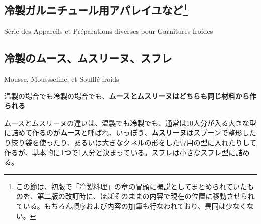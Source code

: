 \begin{main}

\hypertarget{serie-des-appareiles-et-preparations-diverses-pour-garnitures-froides}{%
\section[冷製ガルニチュール用アパレイユなど]{\texorpdfstring{冷製ガルニチュール用アパレイユなど\footnote{この節は、初版で「冷製料理」の章の冒頭に概説としてまとめられていたものを、第二版の改訂時に、ほぼそのままの内容で現在の位置に移動させられている。もちろん順序および内容の加筆も行なわれており、異同は少なくない。}}{冷製ガルニチュール用アパレイユなど}}\label{serie-des-appareiles-et-preparations-diverses-pour-garnitures-froides}}

\begin{frsecenv}

Série des Appareils et Préparations diverses pour Garnitures froides

\end{frsecenv}


\hypertarget{mousses-mousselines-et-souffles-froids}{%
\subsection{冷製のムース、ムスリーヌ、スフレ}\label{mousses-mousselines-et-souffles-froids}}

\begin{frsecbenv}

Mousse, Moussseline, et Soufflé froids

\end{frsecbenv}


温製の場合でも冷製の場合でも、\textbf{ムースとムスリーヌはどちらも同じ材料から作られる}

ムースとムスリーヌの違いは、温製でも冷製でも、通常は10人分が入る大きな型に詰めて作るのが\textbf{ムース}と呼ばれ、いっぽう、\textbf{ムスリーヌ}はスプーンで整形したり絞り袋を使ったり、あるいは大きなクネルの形をした専用の型に入れたりして作るが、基本的に\textbf{1つ}で1人分と決まっている。スフレは小さなスフレ型に詰める。

\end{main}

